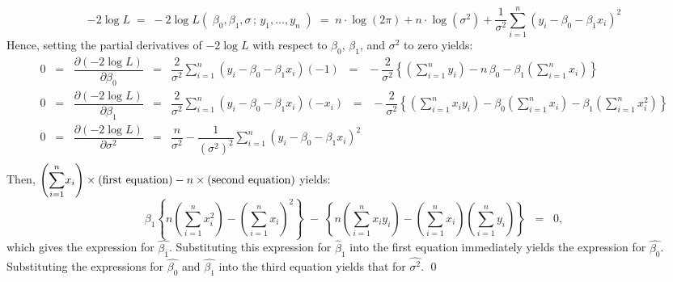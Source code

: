 \documentclass{article}
\begin{document}
\proof
\begin{equation*}
-2\log L \;=\; -2\log L\!\left(\;\beta_{0},\beta_{1},\sigma\,;\,y_{1},\ldots,y_{n}\;\right)
\;=\;
n\cdot\log(2\pi) + n\cdot\log\!\left(\sigma^{2}\right)+\dfrac{1}{\sigma^{2}}\sum^{n}_{i=1}\left(y_{i}-\beta_{0}-\beta_{1}x_{i}\right)^{2}
\end{equation*}
Hence, setting the partial derivatives of $-2\log L$ with respect to $\beta_{0}$, $\beta_{1}$, and $\sigma^{2}$ to zero yields:
\begin{eqnarray*}
0\;\; = \;\; \dfrac{\partial(-2\log L)}{\partial\beta_{0}} & = & \dfrac{2}{\sigma^{2}}\sum^{n}_{i=1}\left(y_{i}-\beta_{0}-\beta_{1}x_{i}\right)\left(-1\right) \;\; = \;\; - \dfrac{2}{\sigma^{2}}\left\{\left(\sum^{n}_{i=1}y_{i}\right)-n\,\beta_{0}-\beta_{1}\left(\sum^{n}_{i=1}x_{i}\right)\right\} \\
0\;\; = \;\; \dfrac{\partial(-2\log L)}{\partial\beta_{1}} & = & \dfrac{2}{\sigma^{2}}\sum^{n}_{i=1}\left(y_{i}-\beta_{0}-\beta_{1}x_{i}\right)\left(-x_{i}\right) \;\; = \;\; - \dfrac{2}{\sigma^{2}}\left\{\left(\sum^{n}_{i=1}x_{i}y_{i}\right)-\beta_{0}\left(\sum^{n}_{i=1}x_{i}\right)-\beta_{1}\left(\sum^{n}_{i=1}x_{i}^{2}\right)\right\}  \\
0\;\; = \;\; \dfrac{\partial(-2\log L)}{\partial\sigma^{2}} & = & \dfrac{n}{\sigma^{2}} - \dfrac{1}{(\sigma^{2})^{2}}\sum^{n}_{i=1}\left(y_{i}-\beta_{0}-\beta_{1}x_{i}\right)^{2} \\
\end{eqnarray*}
Then, $\left(\displaystyle{\sum^{n}_{i=1}}x_{i}\right)\times(\textnormal{first equation}) - n\times(\textnormal{second equation})$ yields:
\begin{equation*}
\beta_{1}\left\{n\left(\sum^{n}_{i=1}x_{i}^{2}\right)-\left(\sum^{n}_{i=1}x_{i}\right)^{2}\right\}
\; -\; \left\{n\left(\sum^{n}_{i=1}x_{i}y_{i}\right)-\left(\sum^{n}_{i=1}x_{i}\right)\left(\sum^{n}_{i=1}y_{i}\right)\right\} \;\; = \;\; 0,
\end{equation*}
which gives the expression for $\widehat{\beta_{1}}$.  Substituting this expression for $\widehat{\beta}_{1}$ into the first equation immediately yields the expression for $\widehat{\beta_{0}}$.  Substituting the expressions for $\widehat{\beta_{0}}$ and $\widehat{\beta_{1}}$ into the third equation yields that for $\widehat{\sigma^{2}}$.
\qed
\end{document}
